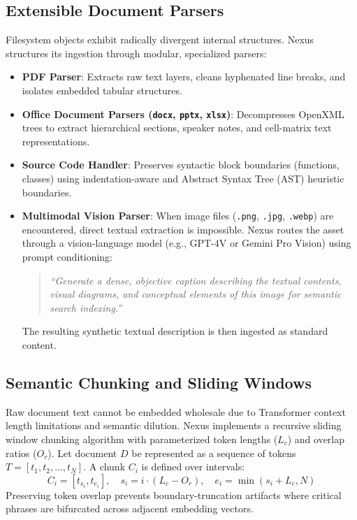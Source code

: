 \documentclass[pdflatex,sn-mathphys-num]{sn-jnl}%
\theoremstyle{thmstyleone}%
\theoremstyle{thmstyletwo}%
\theoremstyle{thmstylethree}%
\begin{document}
\subsection{Extensible Document Parsers}\label{subsec4_1}
Filesystem objects exhibit radically divergent internal structures. Nexus structures its ingestion through modular, specialized parsers:
\begin{itemize}
    \item \textbf{PDF Parser}: Extracts raw text layers, cleans hyphenated line breaks, and isolates embedded tabular structures.
    \item \textbf{Office Document Parsers (\texttt{docx}, \texttt{pptx}, \texttt{xlsx})}: Decompresses OpenXML trees to extract hierarchical sections, speaker notes, and cell-matrix text representations.
    \item \textbf{Source Code Handler}: Preserves syntactic block boundaries (functions, classes) using indentation-aware and Abstract Syntax Tree (AST) heuristic boundaries.
    \item \textbf{Multimodal Vision Parser}: When image files (\texttt{.png}, \texttt{.jpg}, \texttt{.webp}) are encountered, direct textual extraction is impossible. Nexus routes the asset through a vision-language model (e.g., GPT-4V or Gemini Pro Vision) using prompt conditioning:
    \begin{quote}
    \textit{``Generate a dense, objective caption describing the textual contents, visual diagrams, and conceptual elements of this image for semantic search indexing.''}
    \end{quote}
    The resulting synthetic textual description is then ingested as standard content.
\end{itemize}

\subsection{Semantic Chunking and Sliding Windows}\label{subsec4_2}
Raw document text cannot be embedded wholesale due to Transformer context length limitations and semantic dilution. Nexus implements a recursive sliding window chunking algorithm with parameterized token lengths ($L_c$) and overlap ratios ($O_r$). Let document $D$ be represented as a sequence of tokens $T = [t_1, t_2, \dots, t_N]$. A chunk $C_i$ is defined over intervals:
\begin{equation}
C_i = [t_{s_i}, t_{e_i}], \quad s_i = i \cdot (L_c - O_r), \quad e_i = \min(s_i + L_c, N)\label{eq_chunking}
\end{equation}
Preserving token overlap prevents boundary-truncation artifacts where critical phrases are bifurcated across adjacent embedding vectors.
\end{document}
